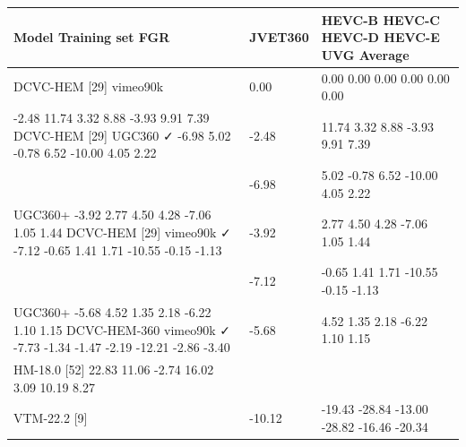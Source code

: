 \begin{tabular}{lll}
\toprule
Model Training set FGR & JVET360 & HEVC-B HEVC-C HEVC-D HEVC-E UVG Average \\
\midrule
DCVC-HEM [29] vimeo90k & 0.00 & 0.00 0.00 0.00 0.00 0.00 0.00 \\
-2.48 11.74 3.32 8.88 -3.93 9.91 7.39 DCVC-HEM [29] UGC360 ✓ -6.98 5.02 -0.78 6.52 -10.00 4.05 2.22 & -2.48 & 11.74 3.32 8.88 -3.93 9.91 7.39 \\
 & -6.98 & 5.02 -0.78 6.52 -10.00 4.05 2.22 \\
UGC360+ -3.92 2.77 4.50 4.28 -7.06 1.05 1.44 DCVC-HEM [29] vimeo90k ✓ -7.12 -0.65 1.41 1.71 -10.55 -0.15 -1.13 & -3.92 & 2.77 4.50 4.28 -7.06 1.05 1.44 \\
 & -7.12 & -0.65 1.41 1.71 -10.55 -0.15 -1.13 \\
UGC360+ -5.68 4.52 1.35 2.18 -6.22 1.10 1.15 DCVC-HEM-360 vimeo90k ✓ -7.73 -1.34 -1.47 -2.19 -12.21 -2.86 -3.40 & -5.68 & 4.52 1.35 2.18 -6.22 1.10 1.15 \\
HM-18.0 [52] 22.83 11.06 -2.74 16.02 3.09 10.19 8.27 &  &  \\
VTM-22.2 [9] & -10.12 & -19.43 -28.84 -13.00 -28.82 -16.46 -20.34 \\
\bottomrule
\end{tabular}
